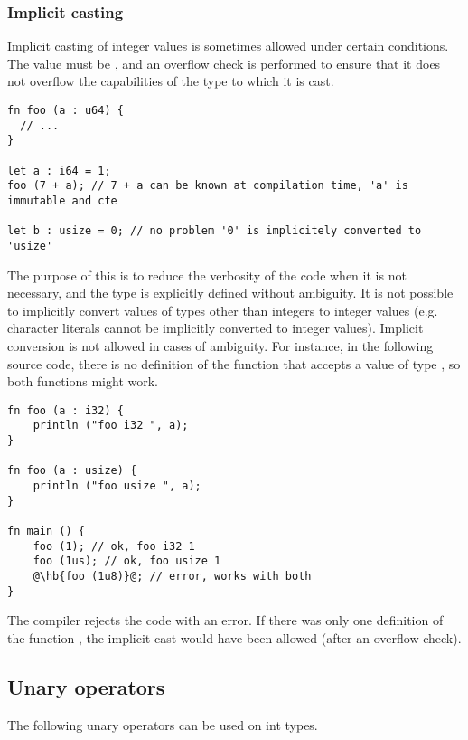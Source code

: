 \subsubsection{Implicit casting}

Implicit casting of integer values is sometimes allowed under certain
conditions. The value must be , and an overflow check is performed
to ensure that it does not overflow the capabilities of the type to which it is
cast.

  \begin{lstlisting}[style=coloredverbatim]
fn foo (a : u64) {
  // ...
}

let a : i64 = 1;
foo (7 + a); // 7 + a can be known at compilation time, 'a' is immutable and cte

let b : usize = 0; // no problem '0' is implicitely converted to 'usize'
  \end{lstlisting}

The purpose of this is to reduce the verbosity of the code when it is not
necessary, and the type is explicitly defined without ambiguity. It is not
possible to implicitly convert values of types other than integers to integer
values (e.g. character literals cannot be implicitly converted to integer
values). Implicit conversion is not allowed in cases of ambiguity. For instance,
in the following source code, there is no definition of the function
 that accepts a value of type , so both functions might
work.

\begin{lstlisting}[style=coloredverbatim, escapechar=@]
fn foo (a : i32) {
    println ("foo i32 ", a);
}

fn foo (a : usize) {
    println ("foo usize ", a);
}

fn main () {
    foo (1); // ok, foo i32 1
    foo (1us); // ok, foo usize 1
    @\hb{foo (1u8)}@; // error, works with both
}
  \end{lstlisting}

The compiler rejects the code with an error. If there was only one definition of
the function , the implicit cast would have been allowed (after an
overflow check).

\subsection{Unary operators}
\label{sec:orge691bb5}

The following unary operators can be used on int types.



